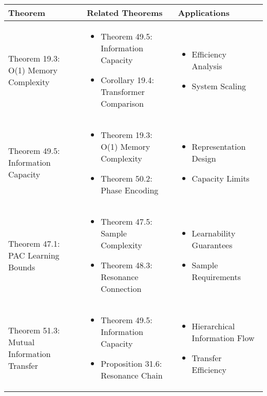 \begin{table}[h]
\centering
\begin{tabular}{|l|p{7cm}|p{4cm}|}
\hline
\textbf{Theorem} & \textbf{Related Theorems} & \textbf{Applications} \\
\hline
Theorem 19.3: O(1) Memory Complexity &
\begin{itemize}
    \item Theorem 49.5: Information Capacity
    \item Corollary 19.4: Transformer Comparison
\end{itemize} &
\begin{itemize}
    \item Efficiency Analysis
    \item System Scaling
\end{itemize} \\
\hline
Theorem 49.5: Information Capacity &
\begin{itemize}
    \item Theorem 19.3: O(1) Memory Complexity
    \item Theorem 50.2: Phase Encoding
\end{itemize} &
\begin{itemize}
    \item Representation Design
    \item Capacity Limits
\end{itemize} \\
\hline
Theorem 47.1: PAC Learning Bounds &
\begin{itemize}
    \item Theorem 47.5: Sample Complexity
    \item Theorem 48.3: Resonance Connection
\end{itemize} &
\begin{itemize}
    \item Learnability Guarantees
    \item Sample Requirements
\end{itemize} \\
\hline
Theorem 51.3: Mutual Information Transfer &
\begin{itemize}
    \item Theorem 49.5: Information Capacity
    \item Proposition 31.6: Resonance Chain
\end{itemize} &
\begin{itemize}
    \item Hierarchical Information Flow
    \item Transfer Efficiency

\end{itemize}
\end{tabular}
\end{table}
